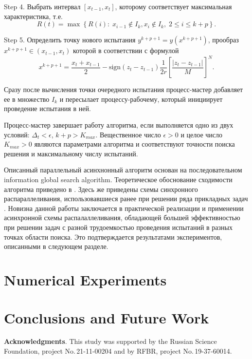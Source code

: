 \documentclass{svproc}
\begin{document}
Step 4. Выбрать интервал $[x_{t-1},x_t]$, которому соответствует максимальная характеристика, т.е.
\[
R(t) = \max \left\{ R(i): \; x_{i-1} \notin I_k, x_i \notin I_k, \; 2\leq i\leq k+p \right\}.
\]

Step 5. Определить точку нового испытания $y^{k+p+1}=y(x^{k+p+1})$, прообраз $x^{k+p+1} \in (x_{t-1},x_t)$ которой в соответствии с формулой
\[
x^{k+p+1} = \frac{x_{t}+x_{t-1}}{2} - \mathrm{sign}(z_{t}-z_{t-1})\frac{1}{2r}\left[\frac{\left|z_{t}-z_{t-1}\right|}{M}\right]^N.
\]


Сразу после вычисления точки очередного испытания процесс-мастер добавляет ее в множество $I_k$ и пересылает процессу-рабочему, который инициирует проведение испытания в ней. 

Процесс-мастер завершает работу алгоритма, если выполняется одно из двух условий: $\Delta_{t}<\epsilon$, $k+p>K_{max}$.
Вещественное число $\epsilon>0$ и целое число $K_{max}>0$ являются параметрами алгоритма и соответствуют точности поиска решения и максимальному числу испытаний.

Описанный параллельный асинхнонный алгоритм основан на последовательном information global search algorithm. Теоретическое обоснование сходимости алгоритма приведено в \cite{Strongin2000}. Здесь же приведены схемы синхронного распараллеливания, использовавшиеся ранее при решении ряда прикладных задач \cite{Kalyulin2017,Modorskii2016}.
Новизна данной работы заключается в практической реализации и применении асинхронной схемы распалаллеливания, обладающей большей эффективностью при решении задач с разной трудоемкостью проведения испытаний в разных точках области поиска. Это подтверждается результатами экспериментов, описанными в следующем разделе.

\section{Numerical Experiments}\label{Sec_Exp}




\section{Conclusions and Future Work}



\medskip

\textbf{Acknowledgments}. This study was supported by the Russian Science Foundation, project No.\,21-11-00204 and by RFBR, project No.\,19-37-60014.

%
%

{}
\end{document}
